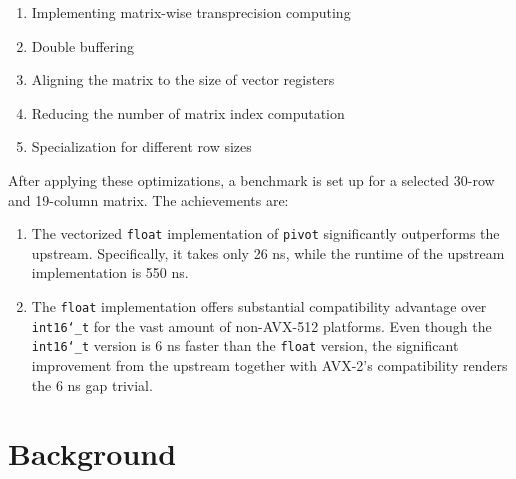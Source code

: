 \documentclass[logo,bsc,singlespacing,parskip]{infthesis}
\newcommand{\dtshort}{\texttt{int16\char`_t}}
\newcommand{\dtfloat}{\texttt{float}}
\newcommand{\pivot}{\texttt{pivot}}
\newenvironment{compactlist}
{ \begin{enumerate}
    \setlength{\itemsep}{0pt}
    \setlength{\parskip}{0pt}
    \setlength{\parsep}{0pt}     
}
{ \end{enumerate} }
\begin{document}
\begin{compactlist} 
    \item Implementing matrix-wise transprecision computing 
    \item Double buffering
    \item Aligning the matrix to the size of vector registers
    \item Reducing the number of matrix index computation
    \item Specialization for different row sizes
\end{compactlist}

After applying these optimizations, a benchmark is set up for a
selected 30-row and 19-column matrix. The achievements are: 
\begin{enumerate}
    \item The vectorized \dtfloat{} implementation of \pivot{} significantly
    outperforms the upstream. Specifically, it takes only 26 ns, while the
    runtime of the upstream implementation is 550 ns. 
    \item The \dtfloat{} implementation offers substantial compatibility
    advantage over \linebreak \dtshort{} for the vast amount of non-AVX-512
    platforms. Even though the \dtshort{} version is 6 ns faster than the
    \dtfloat{} version, the significant improvement from the upstream 
    together with AVX-2's compatibility
    renders the 6 ns gap trivial. 
\end{enumerate}


\chapter{Background}
\end{document}
